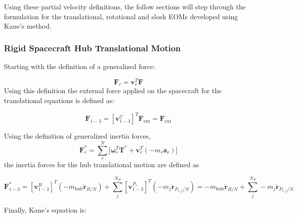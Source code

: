 Using these partial velocity definitions, the follow sections will step through the formulation for the translational, rotational and slosh EOMs developed using Kane's method.

\subsubsection{Rigid Spacecraft Hub Translational Motion}

Starting with the definition of a generalized force:

\begin{equation}
	\bm F_r = \bm v_r^T \bm F
	\label{eq:genActive}
\end{equation}
Using this definition the external force applied on the spacecraft for the translational equations is defined as:

\begin{equation}
	\bm F_{1-3} = [\bm v^C_{1-3}]^T \bm F_{\text{ext}} = \bm F_{\text{ext}}
\end{equation}

Using the definition of generalized inertia forces,
\begin{equation}
	\bm F^*_r = \sum\limits_{r}^{N}\Big[\bm \omega_r^T \bm T^* +  \bm v_r^T (- m_r \bm a_r)\Big]
	\label{eq:genInert}
\end{equation}
the inertia forces for the hub translational motion are defined as

\begin{equation}
	\bm F^*_{1-3} = [\bm v^B_{1-3}]^T (-m_{\text{hub}} \ddot{\bm r}_{B/N}) + \sum\limits_{j}^{N_P}[\bm v^{P_c}_{1-3}]^T (-m_j \ddot{\bm r}_{P_{c,j}/N}) = -m_{\text{hub}} \ddot{\bm r}_{B/N} + \sum\limits_{j}^{N_P} -m_j \ddot{\bm r}_{P_{c,j}/N}
\end{equation}

Finally, Kane's equation is:

